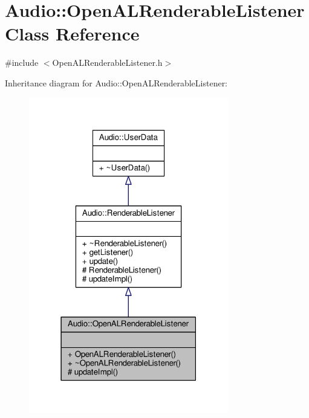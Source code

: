 \hypertarget{classAudio_1_1OpenALRenderableListener}{}\section{Audio\+:\+:Open\+A\+L\+Renderable\+Listener Class Reference}
\label{classAudio_1_1OpenALRenderableListener}


{\ttfamily \#include $<$Open\+A\+L\+Renderable\+Listener.\+h$>$}



Inheritance diagram for Audio\+:\+:Open\+A\+L\+Renderable\+Listener\+:
\nopagebreak
\begin{figure}[H]
\begin{center}
\leavevmode
\includegraphics[width=247pt]{df/d01/classAudio_1_1OpenALRenderableListener__inherit__graph}
\end{center}
\end{figure}


